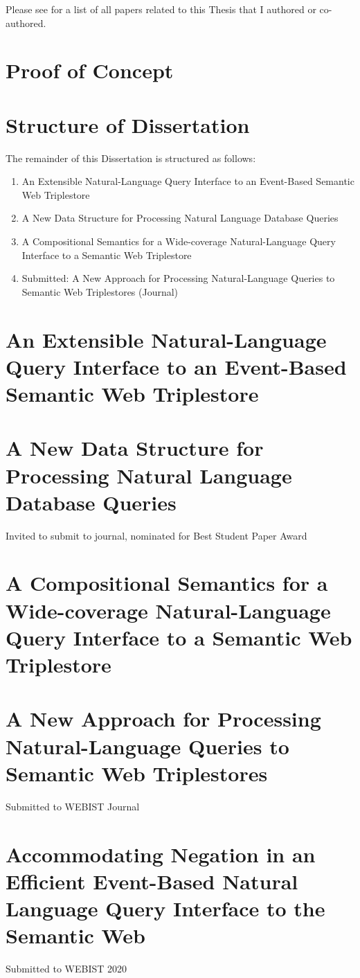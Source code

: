 \documentclass[../main.tex]{subfiles}
\begin{document}
\begin{refsection}
Please see  for a list of all papers related to this Thesis that I authored or co-authored. \cite{peelar2016accommodating}

\section{Proof of Concept} 

\section{Structure of Dissertation}

The remainder of this Dissertation is structured as follows:

\begin{enumerate}
	\item An Extensible Natural-Language Query Interface to an Event-Based Semantic Web Triplestore
	\item A New Data Structure for Processing Natural Language Database Queries 
	\item A Compositional Semantics for a Wide-coverage Natural-Language Query Interface to a Semantic Web Triplestore
	\item Submitted: A New Approach for Processing Natural-Language Queries to Semantic Web Triplestores (Journal)
\end{enumerate}

\section{An Extensible Natural-Language Query Interface to an Event-Based Semantic Web Triplestore}

\section{A New Data Structure for Processing Natural Language Database Queries}

Invited to submit to journal, nominated for Best Student Paper Award

\section{A Compositional Semantics for a Wide-coverage Natural-Language Query Interface to a Semantic Web Triplestore}

\section{A New Approach for Processing Natural-Language Queries to Semantic Web Triplestores}

Submitted to WEBIST Journal

\section{Accommodating Negation in an Efficient Event-Based Natural Language Query Interface to the Semantic Web}

Submitted to WEBIST 2020

\printbibliography[heading=subbibintoc]
\end{refsection}
\end{document}
